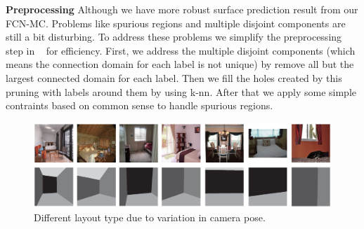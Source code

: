 \textbf{Preprocessing} 
Although we have more robust surface prediction result from our FCN-MC. Problems like spurious regions and multiple disjoint components are still a bit disturbing. To address these problems we simplify the preprocessing step in ~\cite{dasgupta2016delay} for efficiency. First, we address the multiple disjoint components (which means the connection domain for each label is not unique) by remove all but the largest connected domain for each label. Then we fill the holes created by this pruning with labels around them by using k-nn. After that we apply some simple contraints based on common sense to handle spurious regions.
\begin{figure}
	\centering
	\includegraphics[width=\columnwidth]{figure/different-layout-type.png}
	\caption{Different layout type due to variation in camera pose.  }
	\label{fig:different-layout-type}
\end{figure}